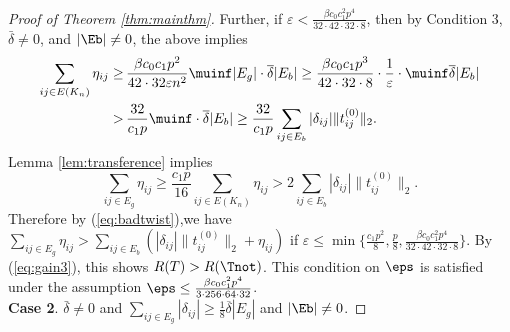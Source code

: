 \begin{proof}[Proof of Theorem \ref{thm:mainthm}]
Further, if $\varepsilon< \frac{\beta c_0 c_1^2 p^4}{32 \cdot 42 \cdot 32 \cdot 8}$, then by Condition 3,
 $\bar{\delta} \neq 0$, and $|\Eb| \neq 0$, the above implies 
\begin{align*}
	\sum_{ij\in E(K_{n})}\eta_{ij}
	\ge&\, \frac{\beta c_{0}c_{1}p^{2}}{42\cdot 32 \varepsilon n^{2}}\muinf|E_{g}|\cdot\overline{\delta}|E_{b}| 
	\ge \frac{\beta c_{0}c_{1}p^{3}}{42\cdot 32 \cdot 8} \cdot \frac{1}{\varepsilon} \cdot \muinf \overline{\delta}|E_{b}|  \\
	>&\, \frac{32}{c_{1}p}\muinf\cdot\overline{\delta}|E_{b}|
	\ge \frac{32}{c_{1}p}\sum_{ij\in E_{b}}|\delta_{ij}|\|t_{ij}^{(0)}\|_2.
\end{align*}
Lemma \ref{lem:transference} implies 
\[
	\sum_{ij\in E_{g}}\eta_{ij}
	\ge \frac{c_{1}p}{16}\sum_{ij\in E(K_{n})}\eta_{ij}
	> 2\sum_{ij\in E_{b}}|\delta_{ij}|\|t_{ij}^{(0)}\|_2.
\]
Therefore by (\ref{eq:badtwist}),we have $\sum_{ij\in E_{g}}\eta_{ij}>\sum_{ij\in E_{b}}(|\delta_{ij}|\|t_{ij}^{(0)}\|_2+\eta_{ij})$ if $\varepsilon \le \min\{\frac{c_1p^2}{8}, \frac{p}{8}, \frac{\beta c_0 c_1^2 p^4}{32 \cdot 42 \cdot 32 \cdot 8} \}$.
By (\ref{eq:gain3}), this shows $R(T)>R(\Tnot)$. This condition on $\eps$ is satisfied under the assumption $\eps \leq \frac{\beta c_0 c_1^2 p^4}{3\cdot 256 \cdot 64 \cdot 32}$.
\\

\noindent\textbf{Case 2}. $\bar{\delta} \neq 0$ and $\sum_{ij\in E_{g}}|\delta_{ij}|\ge\frac{1}{8}\overline{\delta}|E_{g}|$  and $|\Eb| \neq 0$. 
\medskip


\end{proof}
